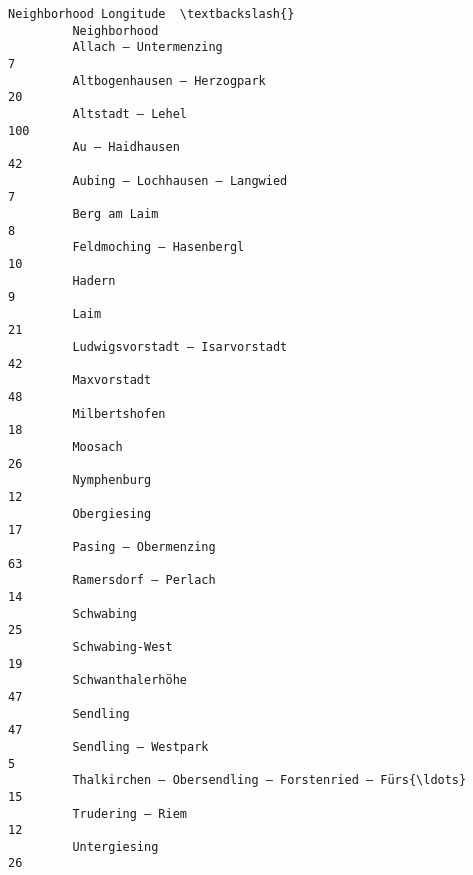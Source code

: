 \documentclass[11pt]{article}
\begin{document}
\begin{Verbatim}[commandchars=\\\{\}]
                                                             Neighborhood Longitude  \textbackslash{}
         Neighborhood                                                                 
         Allach – Untermenzing                                                    7   
         Altbogenhausen – Herzogpark                                             20   
         Altstadt – Lehel                                                       100   
         Au – Haidhausen                                                         42   
         Aubing – Lochhausen – Langwied                                           7   
         Berg am Laim                                                             8   
         Feldmoching – Hasenbergl                                                10   
         Hadern                                                                   9   
         Laim                                                                    21   
         Ludwigsvorstadt – Isarvorstadt                                          42   
         Maxvorstadt                                                             48   
         Milbertshofen                                                           18   
         Moosach                                                                 26   
         Nymphenburg                                                             12   
         Obergiesing                                                             17   
         Pasing – Obermenzing                                                    63   
         Ramersdorf – Perlach                                                    14   
         Schwabing                                                               25   
         Schwabing-West                                                          19   
         Schwanthalerhöhe                                                        47   
         Sendling                                                                47   
         Sendling – Westpark                                                      5   
         Thalkirchen – Obersendling – Forstenried – Fürs{\ldots}                      15   
         Trudering – Riem                                                        12   
         Untergiesing                                                            26   
         

\end{Verbatim}
\end{document}

